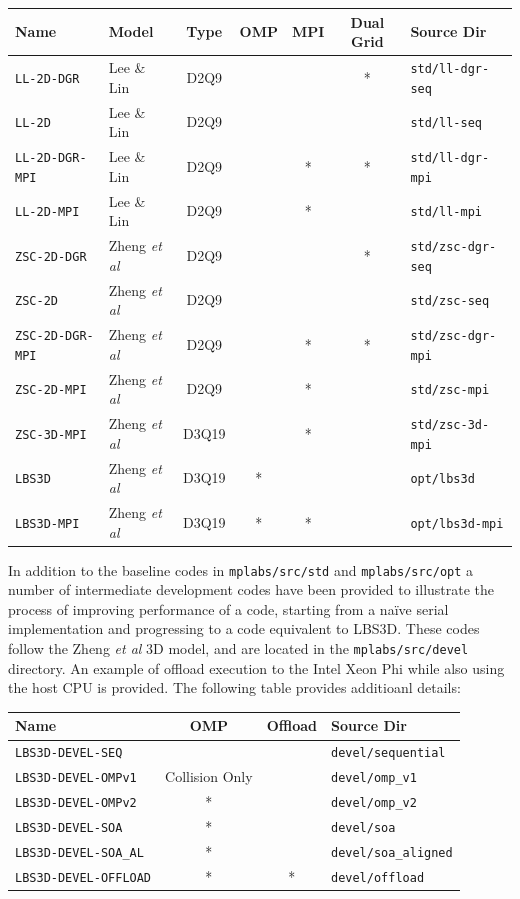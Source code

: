 \documentclass[12pt]{report}
\begin{document}
\begin{tabular}{|l|l|c|c|c|c|l|}
\hline
Name & Model & Type & OMP & MPI & Dual Grid & Source Dir\\
\hline
\texttt{LL-2D-DGR}& Lee \& Lin & D2Q9 & &   & * & \texttt{std/ll-dgr-seq}\\
\hline
\texttt{LL-2D}& Lee \& Lin & D2Q9 &   & &   & \texttt{std/ll-seq}\\
\hline
\texttt{LL-2D-DGR-MPI}& Lee \& Lin & D2Q9 & & * & * & \texttt{std/ll-dgr-mpi}\\
\hline
\texttt{LL-2D-MPI}& Lee \& Lin & D2Q9 & & * &   & \texttt{std/ll-mpi}\\
\hline
\texttt{ZSC-2D-DGR}& Zheng \it{et al} & D2Q9 & &   & * & \texttt{std/zsc-dgr-seq}\\
\hline
\texttt{ZSC-2D}& Zheng \it{et al} & D2Q9 & &   &   & \texttt{std/zsc-seq}\\
\hline
\texttt{ZSC-2D-DGR-MPI}& Zheng \it{et al} & D2Q9 &  & * & * & \texttt{std/zsc-dgr-mpi}\\
\hline
\texttt{ZSC-2D-MPI}& Zheng \it{et al} & D2Q9 & & * &   & \texttt{std/zsc-mpi}\\
\hline
\texttt{ZSC-3D-MPI}& Zheng \it{et al} & D3Q19 & & * &   & \texttt{std/zsc-3d-mpi}\\
\hline
\texttt{LBS3D}& Zheng \it{et al} & D3Q19 & * &  &   & \texttt{opt/lbs3d}\\
\hline
\texttt{LBS3D-MPI}& Zheng \it{et al} & D3Q19 & * & * &   & \texttt{opt/lbs3d-mpi}\\
\hline
\end{tabular}

In addition to the baseline codes in \texttt{mplabs/src/std} and \texttt{mplabs/src/opt} a number of intermediate development codes have been provided to illustrate the process of improving performance of a code, starting from a na\"ive serial implementation and progressing to a code equivalent to LBS3D. These codes follow the Zheng \textit{et al} 3D model, and are located in the \texttt{mplabs/src/devel} directory. An example of offload execution to the Intel Xeon Phi while also using the host CPU is provided. The following table provides additioanl details:

 \begin{tabular}{|l|c|c|l|}
\hline
Name & OMP & Offload & Source Dir\\
\hline
\texttt{LBS3D-DEVEL-SEQ}&  &  & \texttt{devel/sequential}\\
\hline
\texttt{LBS3D-DEVEL-OMPv1}& Collision Only &  & \texttt{devel/omp\_v1}\\
\hline
\texttt{LBS3D-DEVEL-OMPv2}& * &  & \texttt{devel/omp\_v2}\\
\hline
\texttt{LBS3D-DEVEL-SOA}& * &  & \texttt{devel/soa}\\
\hline
\texttt{LBS3D-DEVEL-SOA\_AL}& * &  & \texttt{devel/soa\_aligned}\\
\hline
\texttt{LBS3D-DEVEL-OFFLOAD}& * & * & \texttt{devel/offload}\\
\hline
\end{tabular}
\end{document}
